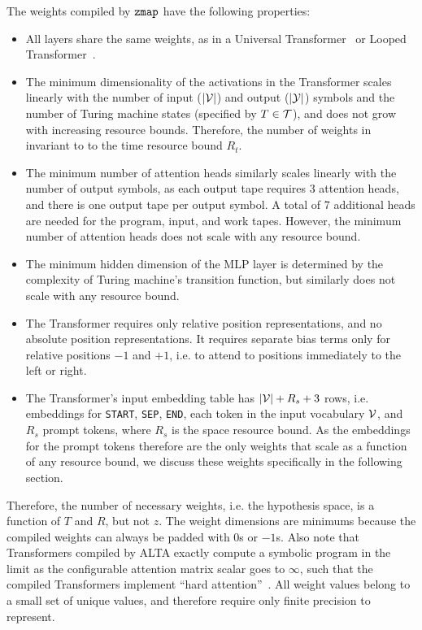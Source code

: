 The weights compiled by $\texttt{zmap}$ have the following properties:
\begin{itemize}
    \item All layers share the same weights, as in a Universal Transformer~\citep{dehghani2019universal} or Looped Transformer~\citep{giannou2023looped}.
    \item The minimum dimensionality of the activations in the Transformer scales linearly with the number of input ($|{\mathcal{V}}|$) and output ($|{\mathcal{Y}}|$) symbols and the number of Turing machine states (specified by $T \in {\mathcal{T}}$), and does not grow with increasing resource bounds. Therefore, the number of weights in invariant to to the time resource bound $R_t$.
    \item The minimum number of attention heads similarly scales linearly with the number of output symbols, as each output tape requires 3 attention heads, and there is one output tape per output symbol. A total of 7 additional heads are needed for the program, input, and work tapes. However, the minimum number of attention heads does not scale with any resource bound.
    \item The minimum hidden dimension of the MLP layer is determined by the complexity of Turing machine's transition function, but similarly does not scale with any resource bound.
    \item The Transformer requires only relative position representations, and no absolute position representations. It requires separate bias terms only for relative positions $-1$ and $+1$, i.e. to attend to positions immediately to the left or right.
    \item The Transformer's input embedding table has $|{\mathcal{V}}| + R_s + 3$ rows, i.e. embeddings for \texttt{START}, \texttt{SEP}, \texttt{END}, each token in the input vocabulary ${\mathcal{V}}$, and $R_s$ prompt tokens, where $R_s$ is the space resource bound. As the embeddings for the prompt tokens therefore are the only weights that scale as a function of any resource bound, we discuss these weights specifically in the following section.
\end{itemize}

Therefore, the number of necessary weights, i.e. the hypothesis space, is a function of $T$ and $R$, but not $z$. The weight dimensions are minimums because the compiled weights can always be padded with $0$s or $-1$s. Also note that Transformers compiled by ALTA exactly compute a symbolic program in the limit as the configurable attention matrix scalar goes to $\infty$, such that the compiled Transformers implement ``hard attention''~\citep{perez2021attention}. All weight values belong to a small set of unique values, and therefore require only finite precision to represent.

